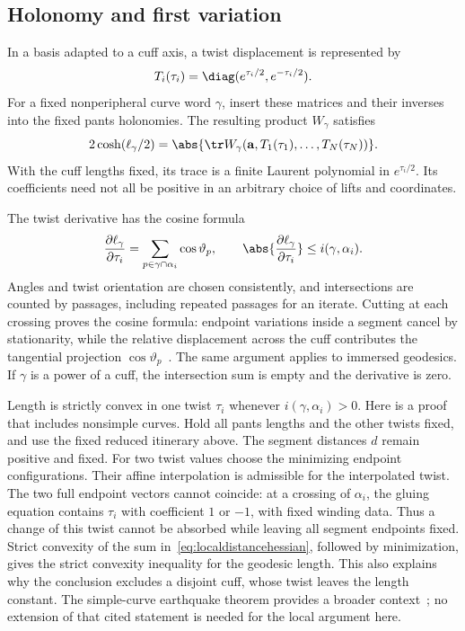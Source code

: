 \subsection{Holonomy and first variation}

In a basis adapted to a cuff axis, a twist displacement is represented by
\[
 T_i(\tau_i)=\diag(e^{\tau_i/2},e^{-\tau_i/2}).
\]
For a fixed nonperipheral curve word $\gamma$, insert these matrices and
their inverses into the fixed pants
holonomies. The resulting product $W_\gamma$ satisfies
\begin{equation}
 2\cosh(\ell_\gamma/2)
  =\abs{\tr W_\gamma(\mathbf a,T_1(\tau_1),\ldots,T_N(\tau_N))}.
 \label{eq:traceword}
\end{equation}
With the cuff lengths fixed, its trace is a finite Laurent polynomial in
$e^{\tau_i/2}$. Its coefficients need not all be positive in an arbitrary
choice of lifts and coordinates.

The twist derivative has the cosine formula
\begin{equation}
 \frac{\partial\ell_\gamma}{\partial\tau_i}
   =\sum_{p\in\gamma\cap\alpha_i}\cos\vartheta_p,
 \qquad
 \abs{\frac{\partial\ell_\gamma}{\partial\tau_i}}
      \le i(\gamma,\alpha_i).
 \label{eq:cosine}
\end{equation}
Angles and twist orientation are chosen consistently, and intersections
are counted by passages, including repeated passages for an iterate.
Cutting at each crossing proves the cosine formula: endpoint variations
inside a segment cancel by stationarity, while the relative displacement
across the cuff contributes the tangential projection
$\cos\vartheta_p$~\cite{WolpertTwist}. The same argument applies to
immersed geodesics. If $\gamma$ is a power of a cuff, the intersection
sum is empty and the derivative is zero.

Length is strictly convex in one twist $\tau_i$ whenever
$i(\gamma,\alpha_i)>0$. Here is a proof that includes nonsimple curves.
Hold all pants lengths and the other twists fixed, and use the fixed
reduced itinerary above. The segment distances $d$ remain positive and
fixed. For two twist values choose the minimizing endpoint configurations.
Their affine interpolation is admissible for the interpolated twist.
The two full endpoint vectors cannot coincide: at a crossing of
$\alpha_i$, the gluing equation contains $\tau_i$ with coefficient
$1$ or $-1$, with fixed winding data. Thus a change of this twist cannot
be absorbed while leaving all segment endpoints fixed. Strict convexity
of the sum in~\eqref{eq:localdistancehessian}, followed by minimization,
gives the strict convexity inequality for the geodesic length. This also
explains why the conclusion excludes a disjoint cuff, whose twist leaves
the length constant. The simple-curve earthquake theorem provides a
broader context~\cite[Theorem 1]{Kerckhoff}; no extension of that cited
statement is needed for the local argument here.

